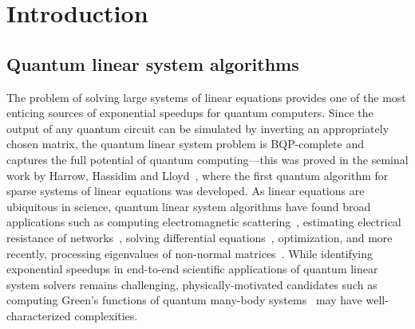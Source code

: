 \documentclass[letterpaper,onecolumn,11pt,accepted=2026-02-14]{quantumarticle}
\theoremstyle{remark}
\theoremstyle{plain}
\begin{document}
\begin{abstract}
\begin{adjustwidth}{-20pt}{-20pt}
We also introduce a \emph{block preconditioning} scheme that can artificially boost $\sqrt{p}$ in generic situations, in contrast to previous negative preconditioning results focusing on reducing $\kappa$. This further reduces the cost of initial state preparation in linear-system-based differential equation solvers, ground state preparators and eigenvalue processors. Additionally, block preconditioning furnishes a particularly simple quantum linear system algorithm with optimal $\mathbf{O}\left(\kappa\log\left(\frac{1}{\epsilon}\right)\right)$ queries to $O_A$ using $|b\rangle$ itself as the preconditioner. It also realizes a block-encoded eigenvalue transformer with $\mathbf{O}(n)$ scaling in degree of the target polynomial, compared to the best existing result of $\mathbf{O}\left(n^{1.5}\right)$.
\end{adjustwidth}
\end{abstract}
\newpage
{
	\thispagestyle{empty}
	\renewcommand{\baselinestretch}{0.95}\normalsize
	\clearpage\tableofcontents
	\renewcommand{\baselinestretch}{1.}\normalsize
	\thispagestyle{empty}
}
\newpage

\section{Introduction}
\label{sec:intro}

\subsection{Quantum linear system algorithms}
\label{sec:intro_qlsa}

The problem of solving large systems of linear equations provides one of the most enticing sources of exponential speedups for quantum computers. Since the output of any quantum circuit can be simulated by inverting an appropriately chosen matrix, the quantum linear system problem is BQP-complete and captures the full potential of quantum computing---this was proved in the seminal work by Harrow, Hassidim and Lloyd~\cite{Harrow2009}, where the first quantum algorithm for sparse systems of linear equations was developed. As linear equations are ubiquitous in science, quantum linear system algorithms have found broad applications such as computing electromagnetic scattering~\cite{Scherer2017}, estimating electrical resistance of networks~\cite{Wang2017Resistence}, solving differential equations~\cite{Berry2017Differential,BerryCosta22,Krovi2023improvedquantum,Fang2023timemarchingbased,AnChildsLin23}, optimization, and more recently, processing eigenvalues of non-normal matrices~\cite{QEVP}.
While identifying exponential speedups in end-to-end scientific applications of quantum linear system solvers remains challenging, physically-motivated candidates such as computing Green's functions of quantum many-body systems~\cite{2021Yupreconditioned} may have well-characterized complexities.
\end{document}
